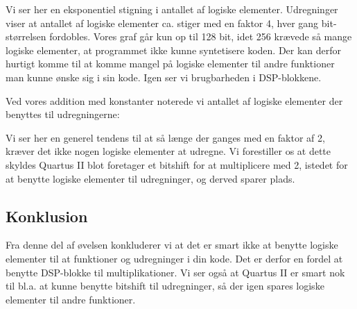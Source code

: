 \documentclass[../journal2.tex]{subfiles}
\begin{document}


Vi ser her en eksponentiel stigning i antallet af logiske elementer. Udregninger viser at antallet af logiske elementer ca. stiger med en faktor 4, hver gang bit-størrelsen fordobles. Vores graf går kun op til 128 bit, idet 256 krævede så mange logiske elementer, at programmet ikke kunne syntetisere koden. Der kan derfor hurtigt komme til at komme mangel på logiske elementer til andre funktioner man kunne ønske sig i sin kode. Igen ser vi brugbarheden i DSP-blokkene.\par

Ved vores addition med konstanter noterede vi antallet af logiske elementer der benyttes til udregningerne:


Vi ser her en generel tendens til at så længe der ganges med en faktor af 2, kræver det ikke nogen logiske elementer at udregne. Vi forestiller os at dette skyldes Quartus II blot foretager et bitshift for at multiplicere med 2, istedet for at benytte logiske elementer til udregninger, og derved sparer plads.

\subsection{Konklusion}

Fra denne del af øvelsen konkluderer vi at det er smart ikke at benytte logiske elementer til at funktioner og udregninger i din kode. Det er derfor en fordel at benytte DSP-blokke til multiplikationer. Vi ser også at Quartus II er smart nok til bl.a. at kunne benytte bitshift til udregninger, så der igen spares logiske elementer til andre funktioner.
\end{document}
